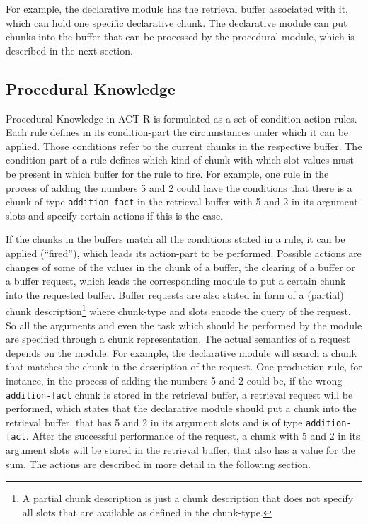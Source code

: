For example, the declarative module has the retrieval buffer associated with it, which can hold one specific declarative chunk. The declarative module can put chunks into the buffer that can be processed by the procedural module, which is described in the next section.

\subsection{Procedural Knowledge}
\label{procedural_knowledge}

Procedural Knowledge in ACT-R is formulated as a set of condition-action rules. Each rule defines in its condition-part the circumstances under which it can be applied. Those conditions refer to the current chunks in the respective buffer. The condition-part of a rule defines which kind of chunk with which slot values must be present in which buffer for the rule to fire. For example, one rule in the process of adding the numbers 5 and 2 could have the conditions that there is a chunk of type \verb|addition-fact| in the retrieval buffer with 5 and 2 in its argument-slots and specify certain actions if this is the case.

If the chunks in the buffers match all the conditions stated in a rule, it can be applied (``fired''), which leads its action-part to be performed. Possible actions are changes of some of the values in the chunk of a buffer, the clearing of a buffer or a buffer request, which leads the corresponding module to put a certain chunk into the requested buffer. Buffer requests are also stated in form of a (partial) chunk description\footnote{A partial chunk description is just a chunk description that does not specify all slots that are available as defined in the chunk-type.} where chunk-type and slots encode the query of the request. So all the arguments and even the task which should be performed by the module are specified through a chunk representation. The actual semantics of a request depends on the module. For example, the declarative module will search a chunk that matches the chunk in the description of the request. One production rule, for instance, in the process of adding the numbers 5 and 2 could be, if the wrong \verb|addition-fact| chunk is stored in the retrieval buffer, a retrieval request will be performed, which states that the declarative module should put a chunk into the retrieval buffer, that has 5 and 2 in its argument slots and is of type \verb|addition-fact|. After the successful performance of the request, a chunk with 5 and 2 in its argument slots will be stored in the retrieval buffer, that also has a value for the sum. The actions are described in more detail in the following section.

